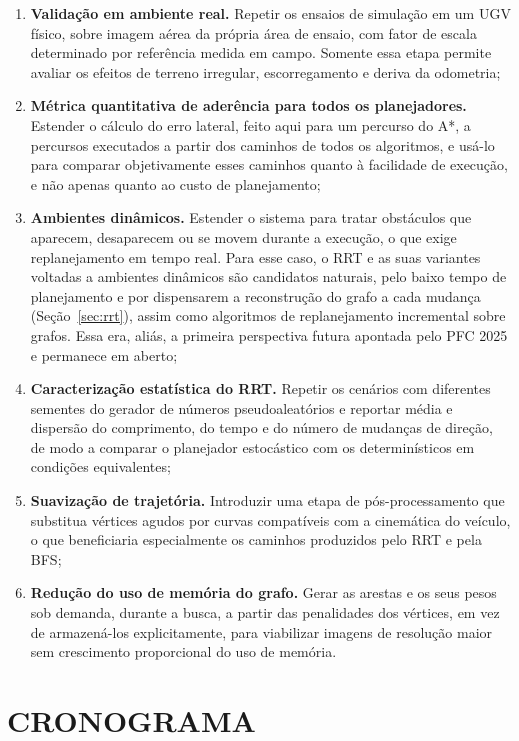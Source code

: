 \documentclass[
    12pt,
    openright,
    oneside,
    a4paper,
    english,
    brazil
]{abntex2}
\begin{document}
\begin{enumerate}
    \item \textbf{Validação em ambiente real.} Repetir os ensaios de simulação em um UGV físico, sobre imagem aérea da própria área de ensaio, com fator de escala determinado por referência medida em campo. Somente essa etapa permite avaliar os efeitos de terreno irregular, escorregamento e deriva da odometria;
    \item \textbf{Métrica quantitativa de aderência para todos os planejadores.} Estender o cálculo do erro lateral, feito aqui para um percurso do A*, a percursos executados a partir dos caminhos de todos os algoritmos, e usá-lo para comparar objetivamente esses caminhos quanto à facilidade de execução, e não apenas quanto ao custo de planejamento;
    \item \textbf{Ambientes dinâmicos.} Estender o sistema para tratar obstáculos que aparecem, desaparecem ou se movem durante a execução, o que exige replanejamento em tempo real. Para esse caso, o RRT e as suas variantes voltadas a ambientes dinâmicos \cite{xu2024} são candidatos naturais, pelo baixo tempo de planejamento e por dispensarem a reconstrução do grafo a cada mudança (Seção~\ref{sec:rrt}), assim como algoritmos de replanejamento incremental sobre grafos. Essa era, aliás, a primeira perspectiva futura apontada pelo PFC 2025 e permanece em aberto;
    \item \textbf{Caracterização estatística do RRT.} Repetir os cenários com diferentes sementes do gerador de números pseudoaleatórios e reportar média e dispersão do comprimento, do tempo e do número de mudanças de direção, de modo a comparar o planejador estocástico com os determinísticos em condições equivalentes;
    \item \textbf{Suavização de trajetória.} Introduzir uma etapa de pós-processamento que substitua vértices agudos por curvas compatíveis com a cinemática do veículo, o que beneficiaria especialmente os caminhos produzidos pelo RRT e pela BFS;
    \item \textbf{Redução do uso de memória do grafo.} Gerar as arestas e os seus pesos sob demanda, durante a busca, a partir das penalidades dos vértices, em vez de armazená-los explicitamente, para viabilizar imagens de resolução maior sem crescimento proporcional do uso de memória.
\end{enumerate}

\chapter{CRONOGRAMA}
\end{document}
